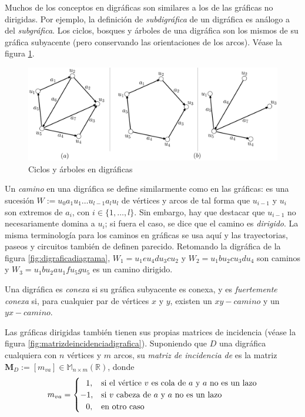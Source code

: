 Muchos de los conceptos en digráficas son similares a los de las gráficas no dirigidas. Por ejemplo, la definición de  \textit{subdigráfica} de un digráfica es análogo a del \textit{subgráfica}. Los ciclos, bosques y árboles de una digráfica son los mismos de su gráfica subyacente (pero conservando las orientaciones de los arcos). Véase la figura \ref{fig:ciclosdigrafica}. 

 \begin{figure}[h]
    \centering
    \includegraphics[scale=0.16]{img/imgchapter1/ciclosdigrafica.jpg}
    \caption{Ciclos y árboles en digráficas}
    \label{fig:ciclosdigrafica}
\end{figure}

Un \textit{camino} en una digráfica se define similarmente como en las gráficas: es una sucesión $W:= u_{0}a_{1}u_{1}\ldots u_{l-1}a_{l}u_{l}$ de vértices y arcos de tal forma que $u_{i-1}$ y $u_{i}$ son extremos de $a_{i}$, con $i\in\{1, \ldots, l\}$. Sin embargo, hay que destacar que $u_{i-1}$ no necesariamente domina a $u_{i}$; si fuera el caso, se dice que el camino es \textit{dirigido}. La misma terminología para los caminos en gráficas se usa aquí y las trayectorias, paseos y circuitos también de definen parecido. Retomando la digráfica de la figura \ref{fig:digraficadiagrama}, $W_{1} = u_{1}eu_{4}du_{3}cu_{2}$ y $W_{2}=u_{1}bu_{2}cu_{3}du_{4}$ son caminos y $W_{3}= u_{1}bu_{2}au_{1}fu_{5}gu_{5}$ es un camino dirigido.

Una digráfica es \textit{conexa} si su gráfica subyacente es conexa, y es \textit{fuertemente conexa} si, para cualquier par de vértices $x$ y $y$, existen un $xy-camino$ y un $yx-camino$.  

Las gráficas dirigidas también tienen sus propias matrices de incidencia (véase la figura \ref{fig:matrizdeincidenciadigrafica}). Suponiendo que $D$ una digráfica cualquiera con $n$ vértices y $m$ arcos, su \textit{matriz de incidencia de} es la matriz $\mathbf{M}_{D}:= [m_{va}] \in \mathbb{M}_{n \times m}(\mathbb{R})$, donde
$$ m_{va}=
\begin{cases}
\hspace{0.7em} 1, & \text{si el vértice } v \text{ es cola de } a \text{ y } a \text{ no es un lazo}\\ 
-1, & \text{si } v \text{ cabeza de } a \text{ y } a \text{ no es un lazo}\\ 
\hspace{0.7em} 0, & \text{en otro caso}
\end{cases}
$$

